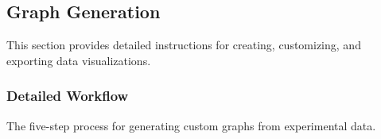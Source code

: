\documentclass[12pt]{article}
\begin{document}

\subsection{Graph Generation}

This section provides detailed instructions for creating, customizing, and
exporting data visualizations.

\subsubsection{Detailed Workflow}

The five-step process for generating custom graphs from experimental data.
\end{document}
